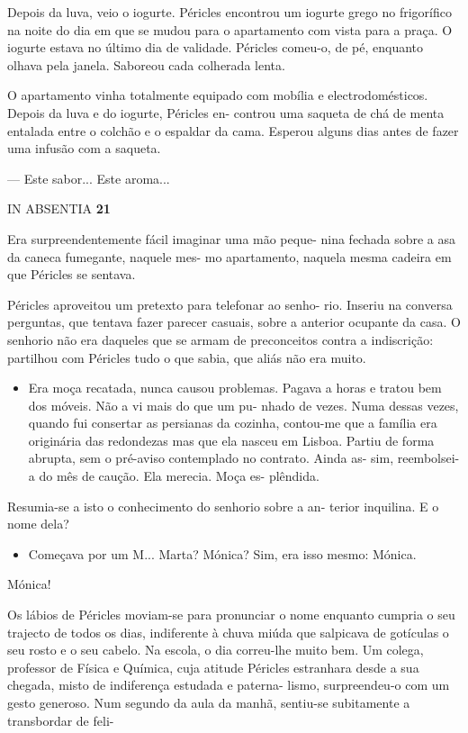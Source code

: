 Depois da luva, veio o iogurte. Péricles encontrou um iogurte grego no
frigorífico na noite do dia em que se mudou para o apartamento com vista
para a praça. O iogurte estava no último dia de validade. Péricles
comeu-o, de pé, enquanto olhava pela janela. Saboreou cada colherada
lenta.

O apartamento vinha totalmente equipado com mobília e electrodomésticos.
Depois da luva e do iogurte, Péricles en- controu uma saqueta de chá de
menta entalada entre o colchão e o espaldar da cama. Esperou alguns dias
antes de fazer uma infusão com a saqueta.

--- Este sabor... Este aroma...

IN ABSENTIA \textbf{21}

Era surpreendentemente fácil imaginar uma mão peque- nina fechada sobre
a asa da caneca fumegante, naquele mes- mo apartamento, naquela mesma
cadeira em que Péricles se sentava.

Péricles aproveitou um pretexto para telefonar ao senho- rio. Inseriu na
conversa perguntas, que tentava fazer parecer casuais, sobre a anterior
ocupante da casa. O senhorio não era daqueles que se armam de
preconceitos contra a indiscrição: partilhou com Péricles tudo o que
sabia, que aliás não era muito.

\begin{itemize}
\tightlist
\item
  Era moça recatada, nunca causou problemas. Pagava a horas e tratou bem
  dos móveis. Não a vi mais do que um pu- nhado de vezes. Numa dessas
  vezes, quando fui consertar as persianas da cozinha, contou-me que a
  família era originária das redondezas mas que ela nasceu em Lisboa.
  Partiu de forma abrupta, sem o pré-aviso contemplado no contrato.
  Ainda as- sim, reembolsei-a do mês de caução. Ela merecia. Moça es-
  plêndida.
\end{itemize}

Resumia-se a isto o conhecimento do senhorio sobre a an- terior
inquilina. E o nome dela?

\begin{itemize}
\tightlist
\item
  Começava por um M... Marta? Mónica? Sim, era isso mesmo: Mónica.
\end{itemize}

Mónica!

Os lábios de Péricles moviam-se para pronunciar o nome enquanto cumpria
o seu trajecto de todos os dias, indiferente à chuva miúda que salpicava
de gotículas o seu rosto e o seu cabelo. Na escola, o dia correu-lhe
muito bem. Um colega, professor de Física e Química, cuja atitude
Péricles estranhara desde a sua chegada, misto de indiferença estudada e
paterna- lismo, surpreendeu-o com um gesto generoso. Num segundo da aula
da manhã, sentiu-se subitamente a transbordar de feli-

